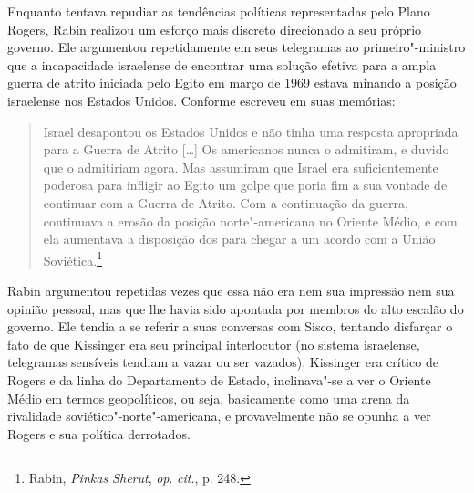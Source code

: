 Enquanto tentava repudiar as tendências políticas representadas pelo
Plano Rogers, Rabin realizou um esforço mais discreto direcionado a seu
próprio governo. Ele argumentou repetidamente em seus telegramas ao
primeiro"-ministro que a incapacidade israelense de encontrar uma solução
efetiva para a ampla guerra de atrito iniciada pelo Egito em março de
1969 estava minando a posição israelense nos Estados Unidos. Conforme
escreveu em suas memórias: 

\begin{quote}
Israel desapontou os Estados Unidos e não
tinha uma resposta apropriada para a Guerra de Atrito {[}\ldots{}{]} Os americanos
nunca o admitiram, e duvido que o admitiriam agora. Mas assumiram que
Israel era suficientemente poderosa para infligir ao Egito um golpe que
poria fim a sua vontade de continuar com a Guerra de Atrito. Com a
continuação da guerra, continuava a erosão da posição norte"-americana no
Oriente Médio, e com ela aumentava a disposição dos  para chegar a um
acordo com a União Soviética.\footnote{Rabin, \emph{Pinkas Sherut}, 
\emph{op}. \emph{cit}., p. 248.}
\end{quote}

Rabin argumentou repetidas vezes que essa não era nem sua impressão nem
sua opinião pessoal, mas que lhe havia sido apontada por membros do alto
escalão do governo. Ele tendia a se referir a suas conversas com Sisco,
tentando disfarçar o fato de que Kissinger era seu principal
interlocutor (no sistema israelense, telegramas sensíveis tendiam a
vazar ou ser vazados). Kissinger era crítico de Rogers e da linha do
Departamento de Estado, inclinava"-se a ver o Oriente Médio em termos
geopolíticos, ou seja, basicamente como uma arena da rivalidade
soviético"-norte"-americana, e provavelmente não se opunha a ver
Rogers e sua política derrotados.

